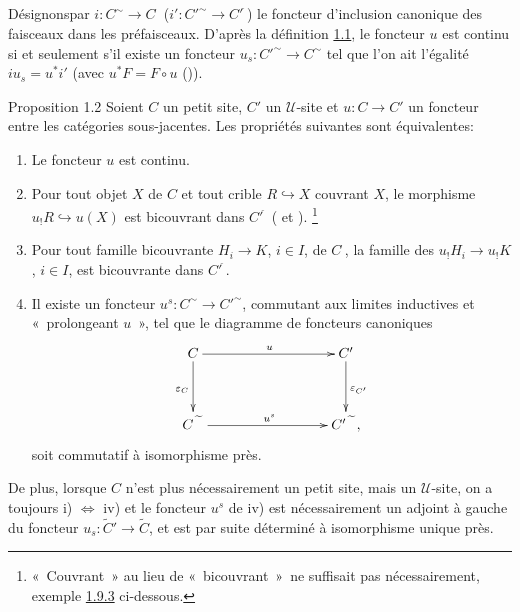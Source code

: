 \documentclass[10pt]{../fichiers-configuration-latex/smfart}
\begin{document}
\setcounter{subsection}{10}
\subsection{}
Désignons\pageoriginale par $i:C^{\sim}\rightarrow
C^{\widehat{\phantom{,}}}$ (\resp $i':{C'}^{\sim}\rightarrow
{C'}^{\widehat{\phantom{,}}}$) le foncteur d'inclusion canonique des
faisceaux dans les préfaisceaux. D'après la définition
\hyperref[III.def1.1]{1.1}, le foncteur $u$ est continu si et seulement s'il
existe un foncteur $u_s:{C'}^{\sim}\rightarrow C^{\sim}$ tel que
l'on ait l'égalité $iu_s=u^\ast i'$ (avec $u^\ast F=F\circ
u$ ()).

\begin{enonce*}{Proposition 1.2}
Soient $C$ un petit site, $C'$ un $𝒰$-site et
$u:C\rightarrow C'$ un foncteur entre les catégories
sous-jacentes. Les propriétés suivantes sont
équivalentes:
\begin{enumerate}
\renewcommand{\theenumi}{\roman{enumi}}
\renewcommand{\labelenumi}{\theenumi)}
\item Le foncteur $u$ est continu.

\item Pour tout objet $X$ de $C$ et tout crible $R\hookrightarrow X$
  couvrant $X$, le morphisme $u_{!}R\hookrightarrow u(X)$ est
  bicouvrant dans ${C'}^{\widehat{\phantom{,}}}$ {\rm(
  et ).} \footnote[1]{« Couvrant » au lieu de « bicouvrant »\
  ne suffisait pas nécessairement, \cf exemple \hyperref[III.exem1.9.3]{1.9.3} ci-dessous.}

\item Pour tout famille bicouvrante $H_i\rightarrow K$, $i\in I$, de
  $C^{\widehat{\phantom{,}}}$, la famille des $u_{!}H_i\rightarrow
  u_{!}K$, $i\in I$, est bicouvrante dans
  ${C'}^{\widehat{\phantom{,}}}$.

\item Il existe un foncteur
  $u^s:C^{\sim}\rightarrow
  {C'}^{\sim}$, commutant aux limites inductives et
  « prolongeant $u$ », \ie tel que le diagramme de foncteurs
  canoniques
\[
\xymatrix@C=3cm@R=1.25cm{
  C \ar[r]^{u} \ar[d]_{\epsilon_C} & C' \ar[d]^{\epsilon_{C'}}\\
C{\widetilde{\phantom{A}}} \ar[r]^{u^s}&
  C'{\widetilde{\phantom{A}}},
}
\]
soit commutatif à isomorphisme près.
\end{enumerate}

De plus, lorsque $C$ n'est plus nécessairement un petit site,
mais un $𝒰$-site, on a toujours {\rm i) $\Leftrightarrow$
iv)} et le foncteur $u^s$ de {\rm iv)} est nécessairement un
adjoint à gauche du foncteur $u_s:\widetilde{C}'\rightarrow
\widetilde{C}$, et est par suite déterminé à isomorphisme
unique près.
\end{enonce*}
\end{document}

